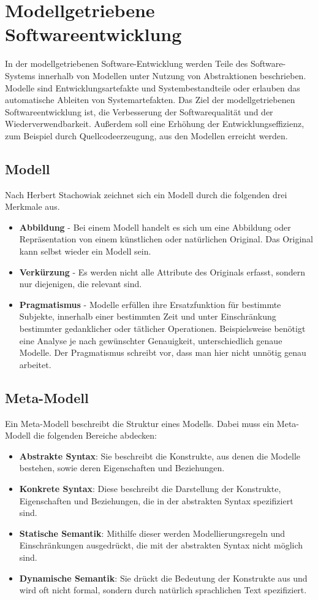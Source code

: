 \section{Modellgetriebene Softwareentwicklung}
In der modellgetriebenen Software-Entwicklung \cite{MDSD} werden Teile des Software-Systems innerhalb von Modellen unter Nutzung von Abstraktionen beschrieben. Modelle sind Entwicklungsartefakte und Systembestandteile oder erlauben das automatische Ableiten von Systemartefakten. Das Ziel der modellgetriebenen Softwareentwicklung ist, die Verbesserung der Softwarequalität und der Wiederverwendbarkeit. Außerdem soll eine Erhöhung der Entwicklungseffizienz, zum Beispiel durch Quellcodeerzeugung, aus den Modellen erreicht werden.

\subsection{Modell}
Nach Herbert Stachowiak \cite{Stachowiak1973} zeichnet sich ein Modell durch die folgenden drei Merkmale aus.
\begin{itemize}
\item \textbf{Abbildung} - Bei einem Modell handelt es sich um eine Abbildung oder Repräsentation von einem künstlichen oder natürlichen Original. Das Original kann selbst wieder ein Modell sein. 
\item \textbf{Verkürzung} - Es werden nicht alle Attribute des Originals erfasst, sondern nur diejenigen, die relevant sind.
\item \textbf{Pragmatismus} - Modelle erfüllen ihre Ersatzfunktion für bestimmte Subjekte, innerhalb einer bestimmten Zeit und unter Einschränkung bestimmter gedanklicher oder tätlicher Operationen. Beispielsweise benötigt eine Analyse je nach gewünschter Genauigkeit, unterschiedlich genaue Modelle. Der Pragmatismus schreibt vor, dass man hier nicht unnötig genau arbeitet.
\end{itemize} 
\subsection{Meta-Modell}
Ein Meta-Modell beschreibt die Struktur eines Modells. Dabei muss ein Meta-Modell die folgenden Bereiche abdecken:
\begin{itemize}
\item \textbf{Abstrakte Syntax}: Sie beschreibt die Konstrukte, aus denen die Modelle bestehen, sowie deren Eigenschaften und Beziehungen.
\item \textbf{Konkrete Syntax}: Diese beschreibt die Darstellung der Konstrukte, Eigenschaften und Beziehungen, die in der abstrakten Syntax spezifiziert sind.
\item \textbf{Statische Semantik}: Mithilfe dieser werden Modellierungsregeln und Einschränkungen ausgedrückt, die mit der abstrakten Syntax nicht möglich sind.
\item \textbf{Dynamische Semantik}: Sie drückt die Bedeutung der Konstrukte aus und wird oft nicht formal, sondern durch natürlich sprachlichen Text spezifiziert.
\end{itemize}

